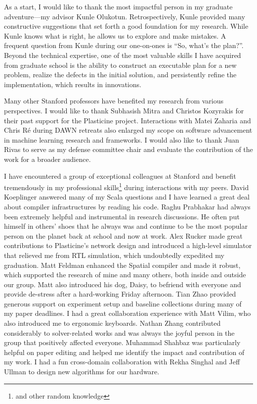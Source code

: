 
As a start, I would like to thank the most impactful person in my graduate adventure---my advisor
Kunle Olukotun.
Retrospectively, Kunle provided many constructive suggestions that set forth a good foundation for my research.
While Kunle knows what is right, he allows us to explore and make mistakes.
A frequent question from Kunle during our one-on-ones is ``So, what's the plan?''.
Beyond the technical expertise, one of the most valuable skills I have acquired from graduate school is the ability to construct an executable plan for a new problem, realize the defects in the initial solution, and persistently refine the implementation, which results in innovations.

Many other Stanford professors have benefited my research from various perspectives.
I would like to thank Subhasish Mitra and Christos Kozyrakis for their past support for the
Plasticine project.
Interactions with Matei Zaharia and Chris R\'e during DAWN retreats also enlarged my scope on 
software advancement in machine learning research and frameworks.
I would also like to thank Juan Rivas to serve as my defense committee chair and evaluate the
contribution of the work for a broader audience.

I have encountered a group of exceptional colleagues at Stanford and
benefit tremendously in my professional skills\footnote{and other random knowledge} during interactions with my peers.
David Koeplinger answered many of my Scala questions and I have learned a great deal about compiler
infrastructures by reading his code.
Raghu Prabhakar had always been extremely helpful and instrumental in research discussions. 
He often put himself in others' shoes that he always was and continue to be the most popular person on the planet back at school and now at work.
Alex Rucker made great contributions to Plasticine's network design and introduced a high-level simulator that relieved me from RTL simulation, which undoubtedly expedited my graduation.
Matt Feldman enhanced the Spatial compiler and made it robust, which supported the research of mine and many
others, both inside and outside our group.
Matt also introduced his dog, Daisy, to befriend with everyone and 
provide de-stress after a hard-working Friday afternoon.
Tian Zhao provided generous support on experiment setup and baseline collections during many of my paper deadlines.
I had a great collaboration experience with Matt Vilim, who also introduced me to ergonomic keyboards.
Nathan Zhang contributed considerably to solver-related works and was always the joyful person in the group that positively affected everyone.
Muhammad Shahbaz was particularly helpful on paper editing and helped me identify the impact and contribution of my work.
I had a fun cross-domain collaboration with Rekha Singhal and Jeff Ullman to design new algorithms for our
hardware.

